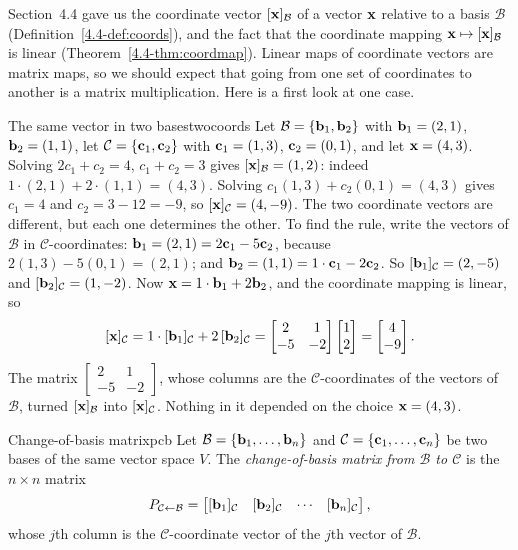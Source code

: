 \documentclass[11pt]{article}
\begin{document}
Section~4.4 gave us the coordinate vector $[\mathbf{x}]_{\mathcal{B}}$ of a vector $\mathbf{x}$ relative to a basis $\mathcal{B}$ (Definition~\ref{4.4-def:coords}), and the fact that the coordinate mapping $\mathbf{x}\mapsto[\mathbf{x}]_{\mathcal{B}}$ is linear (Theorem~\ref{4.4-thm:coordmap}). Linear maps of coordinate vectors are matrix maps, so we should expect that going from one set of coordinates to another is a matrix multiplication. Here is a first look at one case.

\begin{exmp}{The same vector in two bases}{twocoords}
Let $\mathcal{B}=\{\mathbf{b}_1,\mathbf{b}_2\}$ with $\mathbf{b}_1=(2,1)$, $\mathbf{b}_2=(1,1)$, let $\mathcal{C}=\{\mathbf{c}_1,\mathbf{c}_2\}$ with $\mathbf{c}_1=(1,3)$, $\mathbf{c}_2=(0,1)$, and let $\mathbf{x}=(4,3)$. Solving $2c_1+c_2=4$, $c_1+c_2=3$ gives $[\mathbf{x}]_{\mathcal{B}}=(1,2)$: indeed $1\cdot(2,1)+2\cdot(1,1)=(4,3)$. Solving $c_1(1,3)+c_2(0,1)=(4,3)$ gives $c_1=4$ and $c_2=3-12=-9$, so $[\mathbf{x}]_{\mathcal{C}}=(4,-9)$. The two coordinate vectors are different, but each one determines the other. To find the rule, write the vectors of $\mathcal{B}$ in $\mathcal{C}$-coordinates: $\mathbf{b}_1=(2,1)=2\mathbf{c}_1-5\mathbf{c}_2$, because $2(1,3)-5(0,1)=(2,1)$; and $\mathbf{b}_2=(1,1)=1\cdot\mathbf{c}_1-2\mathbf{c}_2$. So $[\mathbf{b}_1]_{\mathcal{C}}=(2,-5)$ and $[\mathbf{b}_2]_{\mathcal{C}}=(1,-2)$. Now $\mathbf{x}=1\cdot\mathbf{b}_1+2\mathbf{b}_2$, and the coordinate mapping is linear, so
\[
[\mathbf{x}]_{\mathcal{C}}=1\cdot[\mathbf{b}_1]_{\mathcal{C}}+2\,[\mathbf{b}_2]_{\mathcal{C}}=\begin{bmatrix}2&1\\-5&-2\end{bmatrix}\begin{bmatrix}1\\2\end{bmatrix}=\begin{bmatrix}4\\-9\end{bmatrix}.
\]
The matrix $\begin{bmatrix}2&1\\-5&-2\end{bmatrix}$, whose columns are the $\mathcal{C}$-coordinates of the vectors of $\mathcal{B}$, turned $[\mathbf{x}]_{\mathcal{B}}$ into $[\mathbf{x}]_{\mathcal{C}}$. Nothing in it depended on the choice $\mathbf{x}=(4,3)$.
\end{exmp}

\begin{defn}{Change-of-basis matrix}{pcb}
Let $\mathcal{B}=\{\mathbf{b}_1,\dots,\mathbf{b}_n\}$ and $\mathcal{C}=\{\mathbf{c}_1,\dots,\mathbf{c}_n\}$ be two bases of the same vector space $V$. The \emph{change-of-basis matrix from $\mathcal{B}$ to $\mathcal{C}$} is the $n\times n$ matrix
\[
P_{\mathcal{C}\leftarrow\mathcal{B}}=\begin{bmatrix}[\mathbf{b}_1]_{\mathcal{C}}&[\mathbf{b}_2]_{\mathcal{C}}&\cdots&[\mathbf{b}_n]_{\mathcal{C}}\end{bmatrix},
\]
whose $j$th column is the $\mathcal{C}$-coordinate vector of the $j$th vector of $\mathcal{B}$.
\end{defn}
\end{document}
